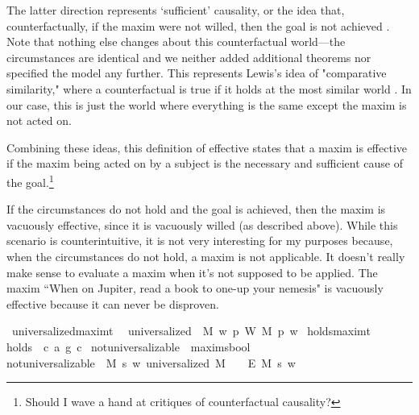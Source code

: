 \begin{isabellebody}
\begin{isamarkuptext}
The latter direction represents `sufficient' causality, or the idea that, counterfactually,
if the maxim were not willed, then the goal is not achieved \cite{lewiscausality}. Note that nothing else changes about this
counterfactual world—the circumstances are identical and we neither added additional theorems nor 
specified the model any further. This represents Lewis's idea of "comparative similarity,"  where 
a counterfactual is true if it holds at the most similar world \cite{lewiscounterfactuals}. In our case, this is just the world 
where everything is the same except the maxim is not acted on.

Combining these ideas, this definition of effective states that a maxim is effective if the 
maxim being acted on by a subject is the necessary and sufficient cause of the goal.\footnote{Should I wave a hand at critiques of counterfactual causality?}

If the circumstances do not hold and the goal is achieved, then the maxim is vacuously effective, since 
it is vacuously willed (as described above). While this scenario is counterintuitive, it is not very 
interesting for my purposes because, when the circumstances do not hold, a maxim is not applicable. It 
doesn't really make sense to evaluate a maxim when it's not supposed to be applied. The maxim ``When on Jupiter,
read a book to one-up your nemesis" is vacuously effective because it can never be disproven.%
\end{isamarkuptext}\isamarkuptrue%
\isamarkupfalse%
\ universalized{\isacharcolon}{\isacharcolon}{\isachardoublequoteopen}maxim{\isasymRightarrow}t{\isachardoublequoteclose}\ \ \isanewline
{\isachardoublequoteopen}universalized\ {\isasymequiv}\ {\isasymlambda}M{\isachardot}\ {\isacharparenleft}{\isasymlambda}w{\isachardot}\ {\isacharparenleft}{\isasymforall}p{\isachardot}\ {\isacharparenleft}W\ M\ p{\isacharparenright}\ w{\isacharparenright}{\isacharparenright}{\isachardoublequoteclose}\isanewline
\isanewline
{}\isamarkupfalse%
\ holds{\isacharcolon}{\isacharcolon}{\isachardoublequoteopen}maxim{\isasymRightarrow}t{\isachardoublequoteclose}\ \ \isanewline
{\isachardoublequoteopen}holds\ {\isasymequiv}\ {\isasymlambda}{\isacharparenleft}c{\isacharcomma}\ a{\isacharcomma}\ g{\isacharparenright}{\isachardot}\ c{\isachardoublequoteclose}\isanewline
\isanewline
{}\isamarkupfalse%
\ not{\isacharunderscore}universalizable\ {\isacharcolon}{\isacharcolon}\ {\isachardoublequoteopen}maxim{\isasymRightarrow}s{\isasymRightarrow}bool{\isachardoublequoteclose}\ \ \isanewline
{\isachardoublequoteopen}not{\isacharunderscore}universalizable\ {\isasymequiv}\ {\isasymlambda}M\ s{\isachardot}\ {\isasymforall}w{\isachardot}\ {\isacharparenleft}{\isacharparenleft}universalized\ M{\isacharparenright}\ \ \isactrlbold {\isasymrightarrow}\ {\isacharparenleft}\isactrlbold {\isasymnot}\ {\isacharparenleft}E\ M\ s{\isacharparenright}{\isacharparenright}{\isacharparenright}\ w{\isachardoublequoteclose}\isanewline
%
\end{isabellebody}
